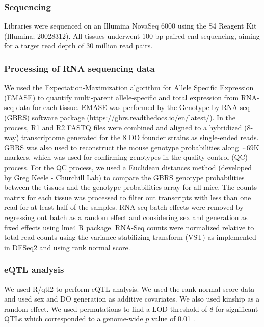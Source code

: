 \documentclass[
]{article}
\begin{document}
\subsubsection{Sequencing}\label{sequencing}

Libraries were sequenced on an Illumina NovaSeq 6000 using the S4
Reagent Kit (Illumina; 20028312). All tissues underwent 100 bp
paired-end sequencing, aiming for a target read depth of 30 million read
pairs.

\subsubsection{Processing of RNA sequencing
data}\label{processing-of-rna-sequencing-data}

We used the Expectation-Maximization algorithm for Allele Specific
Expression (EMASE) \cite{pmid29444201, pmid25236449} to quantify
multi-parent allele-specific and total expression from RNA-seq data for
each tissue. EMASE was performed by the Genotype by RNA-seq (GBRS)
software package (\url{https://gbrs.readthedocs.io/en/latest/}). In the
process, R1 and R2 FASTQ files were combined and aligned to a hybridized
(8-way) transcriptome generated for the 8 DO founder strains as
single-ended reads. GBRS was also used to reconstruct the mouse genotype
probabilities along \(\sim69\)K markers, which was used for confirming
genotypes in the quality control (QC) process. For the QC process, we
used a Euclidean distances method (developed by Greg Keele - Churchill
Lab) to compare the GBRS genotype probabilities between the tissues and
the genotype probabilities array for all mice. The counts matrix for
each tissue was processed to filter out transcripts with less than one
read for at least half of the samples. RNA-seq batch effects were
removed by regressing out batch as a random effect and considering sex
and generation as fixed effects using lme4 R package. RNA-Seq counts
were normalized relative to total read counts using the variance
stabilizing transform (VST) as implemented in DESeq2 and using rank
normal score.

\subsubsection{eQTL analysis}\label{eqtl-analysis}

We used R/qtl2 \cite{pmid30591514} to perform eQTL analysis. We used the
rank normal score data and used sex and DO generation as additive
covariates. We also used kinship as a random effect. We used
permutations to find a LOD threshold of 8 for significant QTLs which
corresponded to a genome-wide \(p\) value of 0.01 \cite{pmid7851788}.
\end{document}
